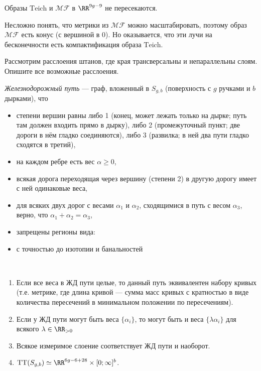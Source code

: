 \documentclass[12pt,a4paper]{article}
\newcommand{\Teich}{\mathrm{Teich}}
\newcommand{\MF}{\mathcal{MF}}
\newcommand{\TT}{\mathrm{TT}}
\begin{document}
    \begin{lemma}
        Образы $\Teich$ и $\MF$ в $\RR^{9g-9}$ не пересекаются.
    \end{lemma}

    \begin{remark}
        Несложно понять, что метрики из $\MF$ можно масштабировать, поэтому образ $\MF$ есть конус (с вершиной в $0$). Но оказывается, что эти лучи на бесконечности есть компактификация образа $\Teich$.
    \end{remark}

    \begin{problem}
        Рассмотрим расслоения штанов, где края трансверсальны и непараллельны слоям. Опишите все возможные расслоения.
    \end{problem}

    \begin{definition}
        \emph{Железнодорожный путь} --- граф, вложенный в $S_{g, b}$ (поверхность с $g$ ручками и $b$ дырками), что
        \begin{itemize}
            \item степени вершин равны либо 1 (конец, может лежать только на дырке; путь там должен входить прямо в дырку), либо 2 (промежуточный пункт; две дороги в нём гладко соединяются), либо 3 (развилка; в ней два пути гладко сходятся в третий),
            \item на каждом ребре есть вес $\alpha \geqslant 0$,
            \item всякая дорога переходящая через вершину (степени 2) в другую дорогу имеет с ней одинаковые веса,
            \item для всяких двух дорог с весами $\alpha_1$ и $\alpha_2$, сходящимися в путь с весом $\alpha_3$, верно, что $\alpha_1 + \alpha_2 = \alpha_3$,
            \item запрещены регионы вида: 
            \item с точностью до изотопии и банальностей 
        \end{itemize}
    \end{definition}

    \begin{lemma}\ 
        \begin{enumerate}
            \item Если все веса в ЖД пути целые, то данный путь эквивалентен набору кривых (т.е. метрике, где длина кривой --- сумма масс кривых с кратностью в виде количества пересечений в минимальном положении по пересечениям).
            \item Если у ЖД пути могут быть веса $\{\alpha_i\}$, то могут быть и веса $\{\lambda\alpha_i\}$ для всякого $\lambda \in \RR_{> 0}$
            \item Всякое измеримое слоение соответствует ЖД пути и наоборот.
            \item $\TT(S_{g, b}) \simeq \RR^{6g - 6 + 28} \times [0; \infty]^b$.
        \end{enumerate}
    \end{lemma}
\end{document}

